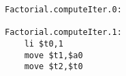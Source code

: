 \documentclass[8pt,a4paper,compress]{beamer}
\begin{document}
\begin{frame}[fragile]
\begin{lstlisting}[language={}]
Factorial.computeIter.0:                                                                                                                                                                                                                      
                                                                                                                                                                                                                                              
Factorial.computeIter.1:                                                                                                                                                                                                                      
    li $t0,1
    move $t1,$a0
    move $t2,$t0
\end{lstlisting}
\end{frame}
\end{document}
